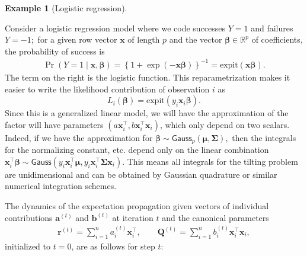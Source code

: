 \documentclass[
  11pt,
  letterpaper,
]{scrbook}
\theoremstyle{definition}
\theoremstyle{plain}
\theoremstyle{plain}
\theoremstyle{plain}
\theoremstyle{definition}
\newtheorem{example}{Example}[chapter]
\theoremstyle{definition}
\theoremstyle{remark}
\begin{document}
\begin{example}[Logistic
regression]\protect\hypertarget{exm-logistic-ep}{}\label{exm-logistic-ep}

Consider a logistic regression model where we code successes \(Y=1\) and
failures \(Y=-1;\) for a given row vector \(\mathbf{x}\) of length \(p\)
and the vector \(\boldsymbol{\beta} \in \mathbb{R}^p\) of coefficients,
the probability of success is \begin{align*}
\Pr(Y=1 \mid \mathbf{x}, \boldsymbol{\beta}) = \left\{1+\exp(-\mathbf{x}\boldsymbol{\beta})\right\}^{-1} = \mathrm{expit}(\mathbf{x}\boldsymbol{\beta}).
\end{align*} The term on the right is the logistic function. This
reparametrization makes it easier to write the likelihood contribution
of observation \(i\) as
\[L_i(\boldsymbol{\beta}) = \mathrm{expit}(y_i \mathbf{x}_i\boldsymbol{\beta}).\]
Since this is a generalized linear model, we will have the approximation
of the factor will have parameters
\((a\mathbf{x}_i^\top, b\mathbf{x}_i^\top\mathbf{x}_i)\), which only
depend on two scalars. Indeed, if we have the approximation for
\(\boldsymbol{\beta} \sim \mathsf{Gauss}_p(\boldsymbol{\mu}, \boldsymbol{\Sigma}),\)
then the integrals for the normalizing constant, etc. depend only on the
linear combination
\(\mathbf{x}_i^\top\boldsymbol{\beta} \sim \mathsf{Gauss}(y_i \mathbf{x}_i^\top\boldsymbol{\mu}, y_i \mathbf{x}_i^\top\boldsymbol{\Sigma}\mathbf{x}_i).\)
This means all integrals for the tilting problem are unidimensional and
can be obtained by Gaussian quadrature or similar numerical integration
schemes.

The dynamics of the expectation propagation given vectors of individual
contributions \(\boldsymbol{a}^{(t)}\) and \(\boldsymbol{b}^{(t)}\) at
iteration \(t\) and the canonical parameters \begin{align*}
\boldsymbol{r}^{(t)} = \sum_{i=1}^n a_i^{(t)}\mathbf{x}_i^\top, \qquad \mathbf{Q}^{(t)} = \sum_{i=1}^n b_i^{(t)}\mathbf{x}_i^\top\mathbf{x}_i,
\end{align*} initialized to \(t=0\), are as follows for step \(t\):


\end{example}
\end{document}
